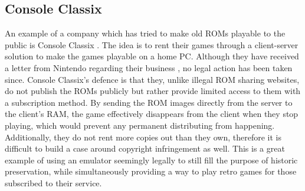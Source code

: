 \subsection{Console Classix}
An example of a company which has tried to make old ROMs playable to the public is Console Classix \cite{romLegal}. The idea is to rent their games through a client-server solution to make the games playable on a home PC. Although they have received a letter from Nintendo regarding their business \cite{letterFromNintendo}, no legal action has been taken since. Console Classix's defence is that they, unlike illegal ROM sharing websites, do not publish the ROMs publicly but rather provide limited access to them with a subscription method. By sending the ROM images directly from the server to the client's RAM, the game effectively disappears from the client when they stop playing, which would prevent any permanent distributing from happening. Additionally, they do not rent more copies out than they own, therefore it is difficult to build a case around copyright infringement as well. This is a great example of using an emulator seemingly legally to still fill the purpose of historic preservation, while simultaneously providing a way to play retro games for those subscribed to their service.


